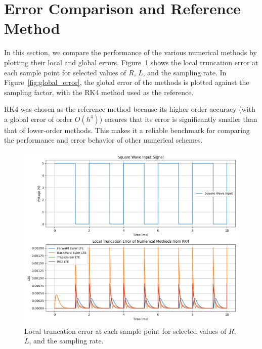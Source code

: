 \documentclass[12pt]{article}
\begin{document}
\section{Error Comparison and Reference Method}
In this section, we compare the performance of the various numerical methods by plotting their local and global errors. Figure~\ref{fig:local_error} shows the local truncation error at each sample point for selected values of $R$, $L$, and the sampling rate. In Figure~\ref{fig:global_error}, the global error of the methods is plotted against the sampling factor, with the RK4 method used as the reference.

RK4 was chosen as the reference method because its higher order accuracy (with a global error of order $O(h^4)$) ensures that its error is significantly smaller than that of lower-order methods. This makes it a reliable benchmark for comparing the performance and error behavior of other numerical schemes.

\begin{figure}[htbp]
  \centering
  \includegraphics[width=\textwidth]{figs/local_error.png}
  \caption{Local truncation error at each sample point for selected values of $R$, $L$, and the sampling rate.}
  \label{fig:local_error}
\end{figure}
\end{document}
